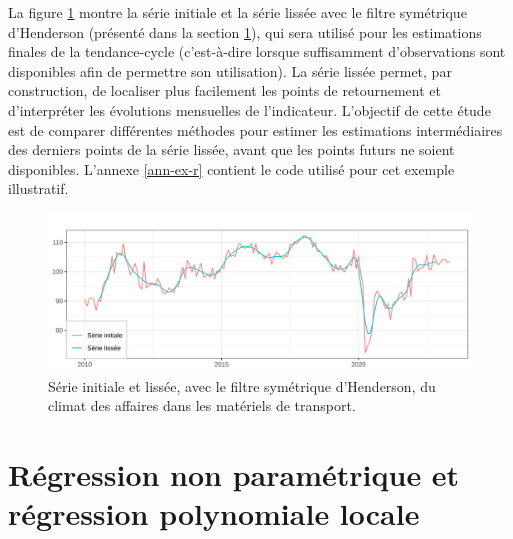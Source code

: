 \documentclass[
  12pt,
  a4paper,french]{article}
\newcommand\1{\mathds{1}}
\begin{document}
La figure \ref{fig:graphs-ex-tcfin} montre la série initiale et la série lissée avec le filtre symétrique d'Henderson (présenté dans la section \ref{sec-nonparamreg}), qui sera utilisé pour les estimations finales de la tendance-cycle (c'est-à-dire lorsque suffisamment d'observations sont disponibles afin de permettre son utilisation).
La série lissée permet, par construction, de localiser plus facilement les points de retournement et d'interpréter les évolutions mensuelles de l'indicateur.
L'objectif de cette étude est de comparer différentes méthodes pour estimer les estimations intermédiaires des derniers points de la série lissée, avant que les points futurs ne soient disponibles.
L'annexe \ref{ann-ex-r} contient le code utilisé pour cet exemple illustratif.

\begin{figure}[H]

{\centering \includegraphics[width=1\linewidth]{img/ex/tc_finale} 

}

\caption[Série initiale et lissée, avec le filtre symétrique d'Henderson, du climat des affaires dans les matériels de transport]{Série initiale et lissée, avec le filtre symétrique d'Henderson, du climat des affaires dans les matériels de transport.}\label{fig:graphs-ex-tcfin}

\footnotesize
\normalsize\end{figure}

\hypertarget{sec-nonparamreg}{%
\section{Régression non paramétrique et régression polynomiale locale}\label{sec-nonparamreg}}
\end{document}
